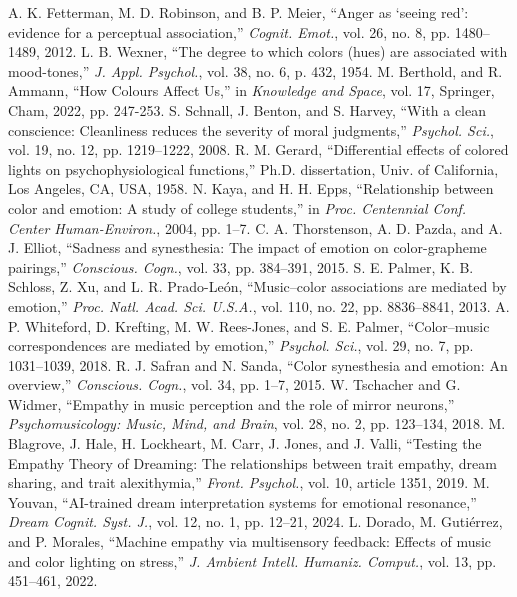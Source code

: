 \documentclass[conference]{IEEEtran}
\begin{document}
	
	\begin{thebibliography}{00}
		 A. K. Fetterman, M. D. Robinson, and B. P. Meier, ``Anger as `seeing red': evidence for a perceptual association,'' \textit{Cognit. Emot.}, vol. 26, no. 8, pp. 1480--1489, 2012.
		 L. B. Wexner, ``The degree to which colors (hues) are associated with mood-tones,'' \textit{J. Appl. Psychol.}, vol. 38, no. 6, p. 432, 1954.
		 M. Berthold, and R. Ammann, ``How Colours Affect Us,'' in \textit{Knowledge and Space}, vol. 17, Springer, Cham, 2022, pp. 247-253.
		 S. Schnall, J. Benton, and S. Harvey, ``With a clean conscience: Cleanliness reduces the severity of moral judgments,'' \textit{Psychol. Sci.}, vol. 19, no. 12, pp. 1219--1222, 2008.
		 R. M. Gerard, ``Differential effects of colored lights on psychophysiological functions,'' Ph.D. dissertation, Univ. of California, Los Angeles, CA, USA, 1958.
		 N. Kaya, and H. H. Epps, ``Relationship between color and emotion: A study of college students,'' in \textit{Proc. Centennial Conf. Center Human-Environ.}, 2004, pp. 1--7.
		 C. A. Thorstenson, A. D. Pazda, and A. J. Elliot, ``Sadness and synesthesia: The impact of emotion on color-grapheme pairings,'' \textit{Conscious. Cogn.}, vol. 33, pp. 384--391, 2015.
         S. E. Palmer, K. B. Schloss, Z. Xu, and L. R. Prado-León, ``Music–color associations are mediated by emotion,'' \textit{Proc. Natl. Acad. Sci. U.S.A.}, vol. 110, no. 22, pp. 8836--8841, 2013.
         A. P. Whiteford, D. Krefting, M. W. Rees-Jones, and S. E. Palmer, ``Color–music correspondences are mediated by emotion,'' \textit{Psychol. Sci.}, vol. 29, no. 7, pp. 1031--1039, 2018.
         R. J. Safran and N. Sanda, ``Color synesthesia and emotion: An overview,'' \textit{Conscious. Cogn.}, vol. 34, pp. 1--7, 2015.
         W. Tschacher and G. Widmer, ``Empathy in music perception and the role of mirror neurons,'' \textit{Psychomusicology: Music, Mind, and Brain}, vol. 28, no. 2, pp. 123--134, 2018.
         M. Blagrove, J. Hale, H. Lockheart, M. Carr, J. Jones, and J. Valli, ``Testing the Empathy Theory of Dreaming: The relationships between trait empathy, dream sharing, and trait alexithymia,'' \textit{Front. Psychol.}, vol. 10, article 1351, 2019.
         M. Youvan, ``AI-trained dream interpretation systems for emotional resonance,'' \textit{Dream Cognit. Syst. J.}, vol. 12, no. 1, pp. 12--21, 2024.
         L. Dorado, M. Gutiérrez, and P. Morales, ``Machine empathy via multisensory feedback: Effects of music and color lighting on stress,'' \textit{J. Ambient Intell. Humaniz. Comput.}, vol. 13, pp. 451--461, 2022.

\end{thebibliography}
\end{document}
